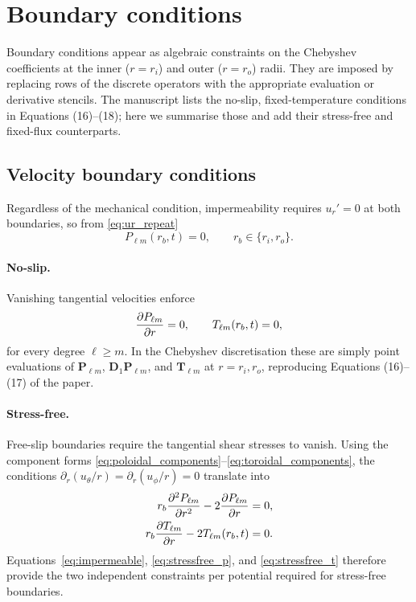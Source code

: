 \documentclass[11pt]{article}
\numberwithin{equation}{section}
\begin{document}
\section{Boundary conditions}
Boundary conditions appear as algebraic constraints on the Chebyshev coefficients at the inner ($r=r_i$) and outer ($r=r_o$) radii. They are imposed by replacing rows of the discrete operators with the appropriate evaluation or derivative stencils. The manuscript lists the no-slip, fixed-temperature conditions in Equations (16)--(18); here we summarise those and add their stress-free and fixed-flux counterparts.

\subsection{Velocity boundary conditions}
Regardless of the mechanical condition, impermeability requires $u_r'=0$ at both boundaries, so from \eqref{eq:ur_repeat}
\begin{equation}
  P_{\ell m}(r_b, t) = 0, \qquad r_b \in \{r_i, r_o\}.
  \label{eq:impermeable}
\end{equation}
\paragraph{No-slip.} Vanishing tangential velocities enforce
\begin{equation}
  \pdv{P_{\ell m}}{r}(r_b, t) = 0, \qquad T_{\ell m}(r_b, t) = 0,
  \label{eq:noslip_bc}
\end{equation}
for every degree $\ell \ge m$. In the Chebyshev discretisation these are simply point evaluations of $\bm{P}_{\ell m}$, $\bm{D}_1 \bm{P}_{\ell m}$, and $\bm{T}_{\ell m}$ at $r=r_i,r_o$, reproducing Equations (16)--(17) of the paper.

\paragraph{Stress-free.} Free-slip boundaries require the tangential shear stresses to vanish. Using the component forms \eqref{eq:poloidal_components}--\eqref{eq:toroidal_components}, the conditions $\partial_r(u_\theta/r)=\partial_r(u_\phi/r)=0$ translate into
\begin{align}
  r_b \pdv[2]{P_{\ell m}}{r}(r_b, t) - 2 \pdv{P_{\ell m}}{r}(r_b, t) &= 0,
  \label{eq:stressfree_p} \\
  r_b \pdv{T_{\ell m}}{r}(r_b, t) - 2 T_{\ell m}(r_b, t) &= 0.
  \label{eq:stressfree_t}
\end{align}
Equations~\eqref{eq:impermeable}, \eqref{eq:stressfree_p}, and \eqref{eq:stressfree_t} therefore provide the two independent constraints per potential required for stress-free boundaries.
\end{document}

